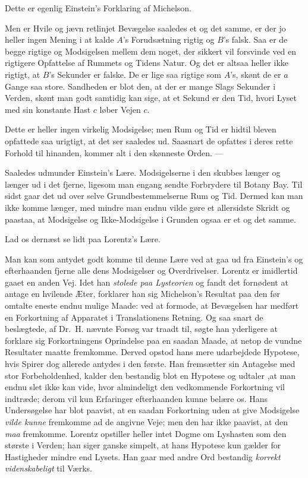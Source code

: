 \documentclass[12pt,a4paper]{article}
\newcommand{\opage}[1]{\marginnote{\footnotesize\textit{[#1]}}}
\begin{document}
Dette er egenlig Einstein's Forklaring af Michelson.

Men er Hvile og jævn retlinjet Bevægelse saaledes et og det samme, er der jo
heller ingen Mening i at kalde $A$'s Forudsætning rigtig og $B$'s falsk. Saa er
de begge rigtige og Modsigelsen mellem dem noget, der sikkert vil forsvinde ved
en rigtigere Opfattelse af Rummets og Tidens Natur. Og det er altsaa heller
ikke rigtigt, at $B$'s Sekunder er falske. De er lige saa rigtige som $A$'s,
skønt de er $a$ Gange saa store. Sandheden er blot den, at der er mange Slags
Sekunder i Verden, skønt man godt samtidig kan sige, at et Sekund er den Tid,
hvori Lyset med sin konstante Hast $c$ løber Vejen $c$.

\opage{204} Dette er heller ingen virkelig Modsigelse; men Rum og Tid er hidtil bleven
opfattede saa urigtigt, at det ser saaledes ud. Saasnart de opfattes i deres
rette Forhold til hinanden, kommer alt i den skønneste Orden. ---

Saaledes udmunder Einstein's Lære. Modsigelserne i den skubbes længer og
længer ud i det fjerne, ligesom man engang sendte Forbrydere til Botany Bay.
Til sidst gaar det ud over selve Grundbestemmelserne Rum og Tid. Dermed kan man
ikke komme længer, med mindre man endnu vilde gøre et allersidste Skridt og
paastaa, at Modsigelse og Ikke-Modsigelse i Grunden ogsaa er et og det samme.

Lad os dernæst se lidt paa Lorentz's Lære.

Man kan som antydet godt komme til denne Lære ved at gaa ud fra Einstein's og
efterhaanden fjerne alle dens Modsigelser og Overdrivelser. Lorentz er
imidlertid gaaet en anden Vej. Idet han \emph{stolede paa Lysteorien} og fandt
det fornødent at antage en hvilende Æter, forklarer han sig Michelson's
Resultat paa den før omtalte eneste endnu mulige Maade: ved at formode, at
Bevægelsen har medført en Forkortning af Apparatet i Translationens Retning. Og
saa snart de beslægtede, af Dr.\ H. nævnte Forsøg var traadt til, søgte han
yderligere at forklare sig Forkortningens Oprindelse paa en saadan Maade, at
netop de vundne Resultater maatte fremkomme. Derved opstod hans mere
udarbejdede Hypotese, hvis Spirer dog allerede antydes i den første. Han
fremsætter sin Antagelse med stor Forbeholdenhed, kalder den bestandig blot en
Hypotese og udtaler ,at man endnu slet ikke kan vide, hvor almindeligt den
vedkommende Forkortning vil indtræde; derom vil kun Erfaringer efterhaanden
kunne belære os. Hans Undersøgelse har blot paavist, at en saadan Forkortning
uden at give Modsigelse \emph{vilde kunne} fremkomme ad de angivne Veje; men
den har ikke paavist, at den \emph{maa} fremkomme. Lorentz opstiller heller
intet Dogme om Lyshasten som den største i Verden; han siger ganske simpelt, at
hans Hypotese kun gælder for Hastigheder mindre end Lysets. Han gaar med andre
Ord bestandig \emph{korrekt videnskabeligt} til Værks.
\end{document}
